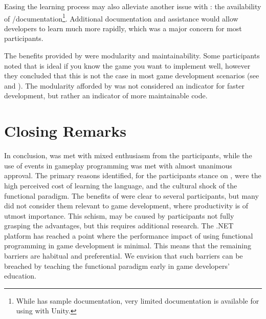 Easing the learning process may also alleviate another issue with \fs: the availability of \unity/\fs documentation\footnote{While \fs has sample documentation, very limited documentation is available for using \fs with Unity.}. Additional documentation and assistance would allow developers to learn much more rapidly, which was a major concern for most participants.

The benefits provided by \fs were modularity and maintainability. Some participants noted that \fs is ideal if you know the game you want to implement well, however they concluded that this is not the case in most game development scenarios (see  and ). The modularity afforded by \fs was not considered an indicator for faster development, but rather an indicator of more maintainable code.

\section{Closing Remarks}
In conclusion, \fs was met with mixed enthusiasm from the participants, while the use of events in gameplay programming was met with almost unanimous approval. The primary reasons identified, for the participants stance on \fs, were the high perceived cost of learning the language, and the cultural shock of the functional paradigm. The benefits of \fs were clear to several participants, but many did not consider them relevant to game development, where productivity is of utmost importance. This schism, may be caused by participants not fully grasping the advantages, but this requires additional research. The .NET platform has reached a point where the performance impact of using functional programming in game development is minimal. This means that the remaining barriers are habitual and preferential. We envision that such barriers can be breached by teaching the functional paradigm early in game developers' education.
